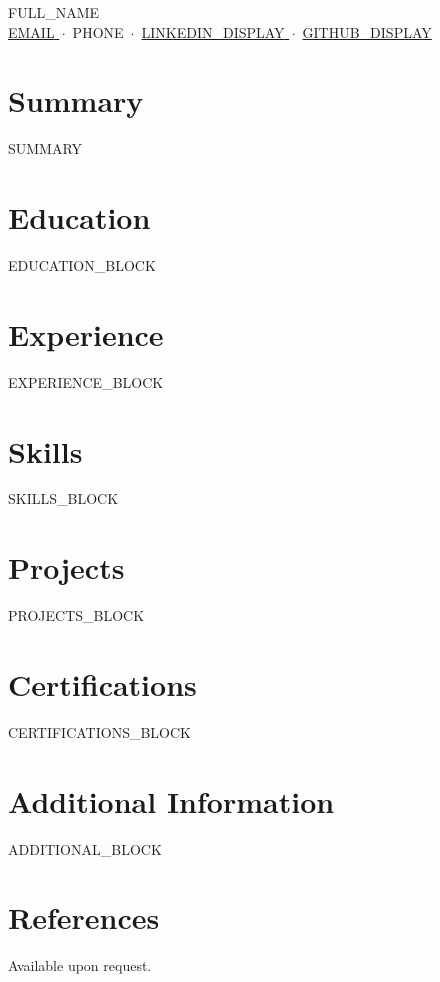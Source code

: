 \documentclass[a4paper,11pt]{article}
\begin{document}
\begin{center}
  {\LARGE {{FULL_NAME}} }\\[5pt]
  {\small
    \href{mailto:{{EMAIL}}}{ {{EMAIL}} } \,$\cdot$\, {{PHONE}} \,$\cdot$\,
    \href{ {{LINKEDIN_URL}} }{ {{LINKEDIN_DISPLAY}} } \,$\cdot$\,
    \href{ {{GITHUB_URL}} }{ {{GITHUB_DISPLAY}} }
  }
\end{center}

\section*{Summary}
{{SUMMARY}}

\section*{Education}
{{EDUCATION_BLOCK}}

\section*{Experience}
{{EXPERIENCE_BLOCK}}

\section*{Skills}
{{SKILLS_BLOCK}}

\section*{Projects}
{{PROJECTS_BLOCK}}

\section*{Certifications}
{{CERTIFICATIONS_BLOCK}}

\section*{Additional Information}
{{ADDITIONAL_BLOCK}}

\section*{References}
Available upon request.
\end{document}
